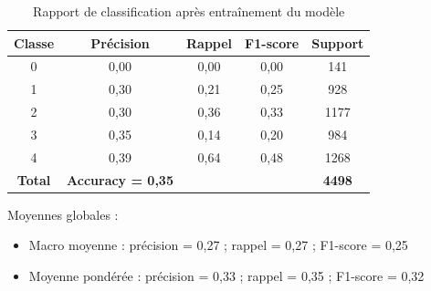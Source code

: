 \documentclass[a4paper,12pt]{article}
\begin{document}
\begin{table}[h]

    \centering

    \begin{tabular}{|c|c|c|c|c|}

        \hline

        \textbf{Classe} & \textbf{Précision}       & \textbf{Rappel} & \textbf{F1-score} & \textbf{Support} \\ \hline

        0               & 0,00                     & 0,00            & 0,00              & 141              \\ \hline

        1               & 0,30                     & 0,21            & 0,25              & 928              \\ \hline

        2               & 0,30                     & 0,36            & 0,33              & 1177             \\ \hline

        3               & 0,35                     & 0,14            & 0,20              & 984              \\ \hline

        4               & 0,39                     & 0,64            & 0,48              & 1268             \\ \hline

        \textbf{Total}  & \textbf{Accuracy = 0,35} &                 &                   & \textbf{4498}    \\ \hline
    \end{tabular}

    \caption{Rapport de classification après entraînement du modèle}

\end{table}

\vspace{0.5cm}

\noindent

Moyennes globales :

\begin{itemize}

    \item Macro moyenne : précision = 0,27 ; rappel = 0,27 ; F1-score = 0,25

    \item Moyenne pondérée : précision = 0,33 ; rappel = 0,35 ; F1-score = 0,32

\end{itemize}
\end{document}
